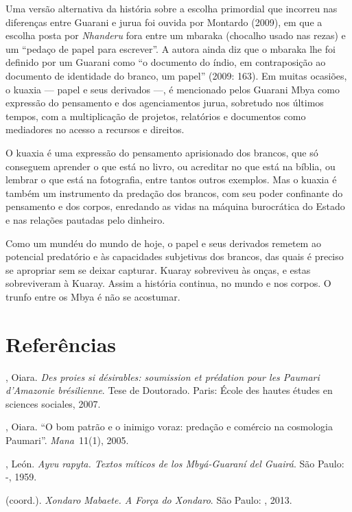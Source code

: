 {{Uma versão alternativa da história sobre a escolha primordial que
incorreu nas diferenças entre Guarani e jurua foi ouvida por Montardo
(2009), em que a escolha posta por \emph{Nhanderu} fora entre um mbaraka
(chocalho usado nas rezas) e um ``pedaço de papel para escrever''. A
autora ainda diz que o mbaraka lhe foi definido por um Guarani como ``o
documento do índio, em contraposição ao documento de identidade do
branco, um papel'' (2009: 163). Em muitas ocasiões, o kuaxia --- papel e
seus derivados ---, é mencionado pelos Guarani Mbya como expressão do
pensamento e dos agenciamentos jurua, sobretudo nos últimos tempos, com
a multiplicação de projetos, relatórios e documentos como mediadores no
acesso a recursos e direitos.

O kuaxia é uma expressão do pensamento aprisionado dos brancos, que só
conseguem aprender o que está no livro, ou acreditar no que está na
bíblia, ou lembrar o que está na fotografia, entre tantos outros
exemplos. Mas o kuaxia é também um instrumento da predação dos brancos,
com seu poder confinante do pensamento e dos corpos, enredando as vidas
na máquina burocrática do Estado e nas relações pautadas pelo dinheiro.


Como um mundéu do mundo de hoje, o papel e seus derivados remetem ao
potencial predatório e às capacidades subjetivas dos brancos, das quais
é preciso se apropriar sem se deixar capturar. Kuaray sobreviveu às
onças, e estas sobreviveram à Kuaray. Assim a história continua, no
mundo e nos corpos. O trunfo entre os Mbya é não se acostumar.

\section{Referências}  

\begin{Parskip}
, Oiara. \emph{Des proies si désirables: soumission et prédation pour
les Paumari d’Amazonie br\'{e}silienne}. Tese de Doutorado. Paris:
École des hautes études en sciences sociales, 2007.

, Oiara. ``O bom patrão e o inimigo voraz: predação e comércio na
cosmologia Paumari''. \emph{Mana~}11(1), 2005.

, León. \emph{Ayvu rapyta. Textos míticos de los Mbyá-Guaraní del
Guairá}. São Paulo: -, 1959.

    (coord.). \emph{Xondaro Mabaete. A Força do
Xondaro}. São Paulo: , 2013.


\end{Parskip}}}
